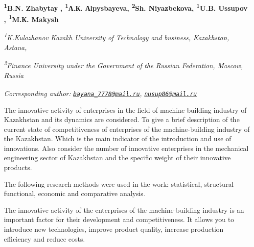 
\begin{articleheader}

{\bfseries 
\textsuperscript{1}B.N. Zhabytaу\textsuperscript{\envelope } ,
\textsuperscript{1}А.К. Аlpysbayeva,
\textsuperscript{2}Sh. Niyazbekova,
\textsuperscript{1}U.B. Ussupov\textsuperscript{\envelope } ,
\textsuperscript{1}M.К. Makysh}
\end{articleheader}

\vspace{0.5em}
\begin{affiliation}
\emph{\textsuperscript{1}K.Kulazhanov Kazakh University of Technology and business, Kazakhstan, Astana,}

\emph{\textsuperscript{2}Finance University under the Government of the Russian Federation, Moscow, Russia}
\vspace{0.5em}

\raggedright \textsuperscript{\envelope }{\em Corresponding author: \href{mailto:bayana_7778@mail.ru}{\nolinkurl{bayana\_7778@mail.ru}}, \href{mailto:nusup86@mail.ru}{\nolinkurl{nusup86@mail.ru}}}
\end{affiliation}

The innovative activity of enterprises in the field of machine-building
industry of Kazakhstan and its dynamics are considered. To give a brief
description of the current state of competitiveness of enterprises of
the machine-building industry of the Kazakhstan. Which is the main
indicator of the introduction and use of innovations. Also consider the
number of innovative enterprises in the mechanical engineering sector of
Kazakhstan and the specific weight of their innovative products.

The following research methods were used in the work: statistical,
structural functional, economic and comparative analysis.

The innovative activity of the enterprises of the machine-building
industry is an important factor for their development and
competitiveness. It allows you to introduce new technologies, improve
product quality, increase production efficiency and reduce costs.

